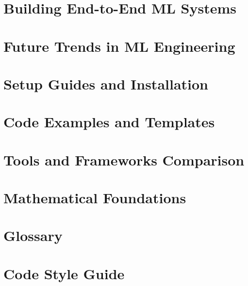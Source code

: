 \documentclass[12pt,a4paper]{book}
\theoremstyle{definition}
\theoremstyle{plain}
\theoremstyle{remark}
\begin{document}
\chapter{Building End-to-End ML Systems}
\label{ch:end_to_end}


\chapter{Future Trends in ML Engineering}
\label{ch:future_trends}


\backmatter

\appendix

\chapter{Setup Guides and Installation}
\label{app:setup}


\chapter{Code Examples and Templates}
\label{app:code}


\chapter{Tools and Frameworks Comparison}
\label{app:tools}


\chapter{Mathematical Foundations}
\label{app:math}


\chapter{Glossary}
\label{app:glossary}


\chapter{Code Style Guide}
\label{app:code_style}




\end{document}
